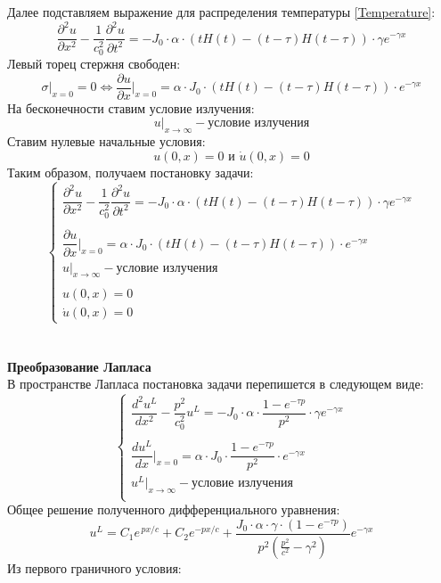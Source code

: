 \documentclass[a4paper, 11pt]{article}
\newcommand{\beq}{\begin{equation}}
\newcommand{\eeq}{\end{equation}}
\newenvironment{solution}
    {\textit{}}
    {}
\begin{document}
\begin{solution}
Далее подставляем выражение для распределения температуры \eqref{Temperature}:
\beq
\frac{\partial^2u}{\partial x^2}-\frac{1}{c_0^2}\frac{\partial^2u}{\partial t^2}=-J_0\cdot\alpha\cdot\left(tH(t)-(t-\tau)H(t-\tau)\right)\cdot\gamma e^{-\gamma x}
\eeq
Левый торец стержня свободен:
\beq
\sigma|_{x=0}=0\Leftrightarrow\frac{\partial u}{\partial x}\bigg|_{x=0}=\alpha\cdot J_0\cdot\left(tH(t)-(t-\tau)H(t-\tau)\right)\cdot e^{-\gamma x}
\eeq
На бесконечности ставим условие излучения:
\beq
u|_{x\rightarrow\infty} -\text{условие излучения}
\eeq
Ставим нулевые начальные условия:
\beq
u(0,x)=0\text{ и }\dot{u}(0,x)=0
\eeq
Таким образом, получаем постановку задачи:
\beq
\begin{cases}
	\dfrac{\partial^2u}{\partial x^2}-\dfrac{1}{c_0^2}\dfrac{\partial^2u}{\partial t^2}=-J_0\cdot\alpha\cdot\left(tH(t)-(t-\tau)H(t-\tau)\right)\cdot\gamma e^{-\gamma x}\\\\
	\dfrac{\partial u}{\partial x}\bigg|_{x=0}=\alpha\cdot J_0\cdot\left(tH(t)-(t-\tau)H(t-\tau)\right)\cdot e^{-\gamma x}\\
	u|_{x\rightarrow\infty} -\text{условие излучения}\\\\
	u(0,x)=0\\
	\dot{u}(0,x)=0
\end{cases}
\eeq
\\\\
\textbf{Преобразование Лапласа}\\

В пространстве Лапласа постановка задачи перепишется в следующем виде:
\beq
\begin{cases}
\dfrac{d^2u^L}{dx^2}-\dfrac{p^2}{c_0^2}u^L=-J_0\cdot\alpha\cdot\dfrac{1-e^{-\tau p}}{p^2}\cdot \gamma e^{-\gamma x}\\\\
\dfrac{du^L}{dx}\bigg|_{x=0}=\alpha\cdot J_0\cdot\dfrac{1-e^{-\tau p}}{p^2}\cdot e^{-\gamma x}\\
u^L|_{x\rightarrow\infty}-\text{условие излучения}\\
\end{cases}
\eeq
Общее решение полученного дифференциального уравнения:
\beq
u^L=C_1e^{\,px/c}+C_2e^{-px/c}+\frac{J_0\cdot\alpha\cdot\gamma\cdot\left(1-e^{-\tau p}\right)}{p^2\left(\frac{p^2}{c^2}-\gamma^2\right)}e^{-\gamma x}
\eeq
Из первого граничного условия:

\end{solution}
\end{document}
